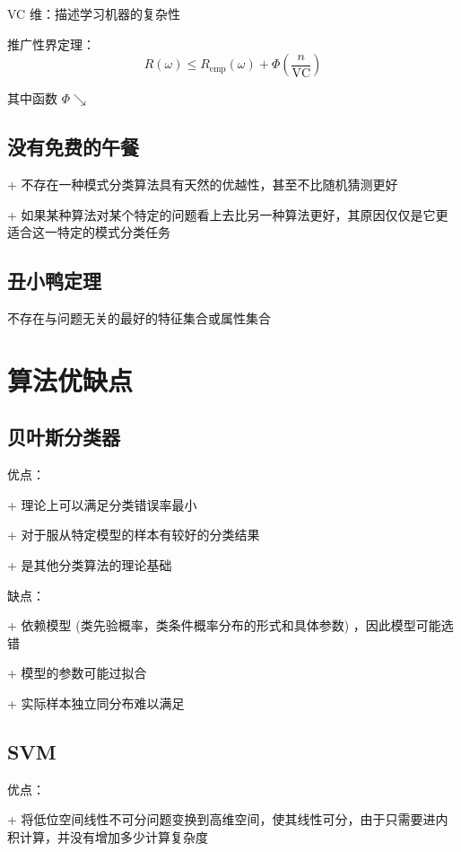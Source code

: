 \documentclass[openany]{ctexbook}
\theoremstyle{kaiti}
\theoremstyle{normal}
\begin{document}
VC 维：描述学习机器的复杂性

推广性界定理：
\begin{equation}
R\left(\omega \right)\leqslant R_{\mathrm{emp}}\left(\omega \right)+\Phi \left(\frac{n}{\mathrm{VC}}\right)
\end{equation}

其中函数 $\Phi \searrow$

\section{没有免费的午餐}

+ 不存在一种模式分类算法具有天然的优越性，甚至不比随机猜测更好

+ 如果某种算法对某个特定的问题看上去比另一种算法更好，其原因仅仅是它更适合这一特定的模式分类任务

\section{丑小鸭定理}

不存在与问题无关的最好的特征集合或属性集合

\chapter{算法优缺点}

\section{贝叶斯分类器}

优点：

+ 理论上可以满足分类错误率最小

+ 对于服从特定模型的样本有较好的分类结果

+ 是其他分类算法的理论基础

缺点：

+ 依赖模型 (类先验概率，类条件概率分布的形式和具体参数) ，因此模型可能选错

+ 模型的参数可能过拟合

+ 实际样本独立同分布难以满足

\section{SVM}

优点：

+ 将低位空间线性不可分问题变换到高维空间，使其线性可分，由于只需要进内积计算，并没有增加多少计算复杂度
\end{document}
